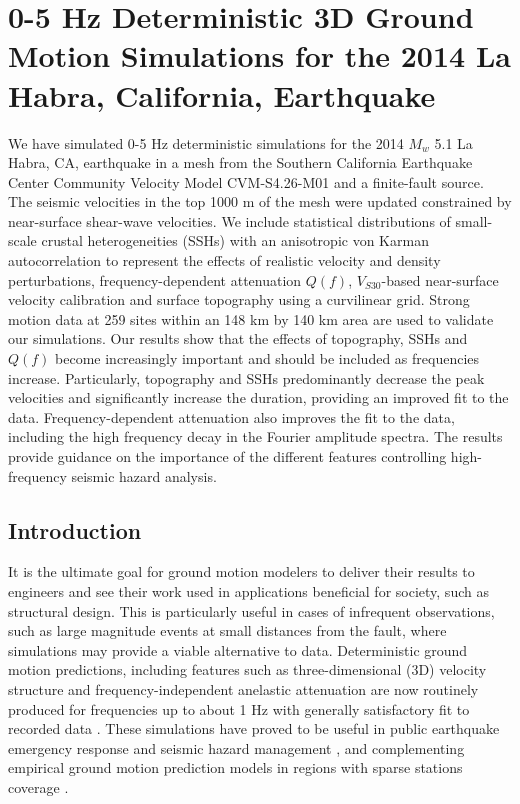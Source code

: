 
\linespread{1.7}
\chapter{0-5 Hz Deterministic 3D Ground Motion Simulations for the 2014 La Habra, California, Earthquake}
\linespread{2.0}
\label{chap:highf}

\graphicspath{{/Users/zhh076/work/PhD_way/high_f/}}

We have simulated 0-5 Hz deterministic simulations for the 2014 $M_w$ 5.1 La Habra, CA, earthquake in a mesh from the Southern California Earthquake Center Community Velocity Model CVM-S4.26-M01 and a finite-fault source. The seismic velocities in the top 1000 m of the mesh were updated constrained by near-surface shear-wave velocities. We include statistical distributions of small-scale crustal heterogeneities (SSHs) with an anisotropic von Karman autocorrelation to represent the effects of realistic velocity and density perturbations, frequency-dependent attenuation $Q(f)$, $V_{S30}$-based near-surface velocity calibration and surface topography using a curvilinear grid. Strong motion data at 259 sites within an 148 km by 140 km area are used to validate our simulations. Our results show that the effects of topography, SSHs and $Q(f)$ become increasingly important and should be included as frequencies increase. Particularly, topography and SSHs predominantly decrease the peak velocities and significantly increase the duration, providing an improved fit to the data. Frequency-dependent attenuation also improves the fit to the data, including the high frequency decay in the Fourier amplitude spectra. The results provide guidance on the importance of the different features controlling high-frequency seismic hazard analysis.


\section{Introduction} \label{highf:intro}
It is the ultimate goal for ground motion modelers to deliver their results to engineers and see their work used in applications beneficial for society, such as structural design. This is particularly useful in cases of infrequent observations, such as large magnitude events at small distances from the fault, where simulations may provide a viable alternative to data. Deterministic ground motion predictions, including features such as three-dimensional (3D) velocity structure and frequency-independent anelastic attenuation are now routinely produced for frequencies up to about 1 Hz with generally satisfactory fit to recorded data . These simulations have proved to be useful in public earthquake emergency response and seismic hazard management \citep{gravesBroadbandGroundMotionSimulation2010}, and complementing empirical ground motion prediction models in regions with sparse stations coverage .

